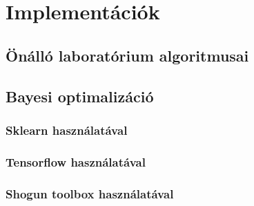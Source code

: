 \chapter{Implementációk}
\label{sec:implementaciok}

\section{Önálló laboratórium algoritmusai}

\section{Bayesi optimalizáció}
\subsection{Sklearn használatával}
\subsection{Tensorflow használatával}
\subsection{Shogun toolbox használatával}
